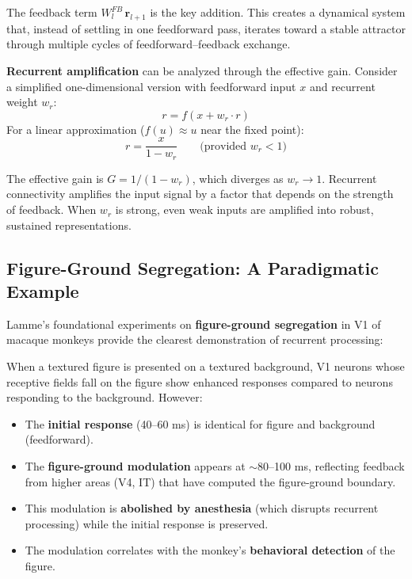 \documentclass[11pt,a4paper]{report}
\begin{document}
The feedback term $W_l^{FB}\, \mathbf{r}_{l+1}$ is the key addition. This creates a dynamical system that, instead of settling in one feedforward pass, iterates toward a stable attractor through multiple cycles of feedforward--feedback exchange.

\textbf{Recurrent amplification} can be analyzed through the effective gain. Consider a simplified one-dimensional version with feedforward input $x$ and recurrent weight $w_r$:
\[
  r = f(x + w_r \cdot r)
\]
For a linear approximation ($f(u) \approx u$ near the fixed point):
\[
  r = \frac{x}{1 - w_r} \qquad \text{(provided } w_r < 1\text{)}
\]

The effective gain is $G = 1/(1 - w_r)$, which diverges as $w_r \to 1$. Recurrent connectivity amplifies the input signal by a factor that depends on the strength of feedback. When $w_r$ is strong, even weak inputs are amplified into robust, sustained representations.

\subsection{Figure-Ground Segregation: A Paradigmatic Example}

Lamme's foundational experiments on \textbf{figure-ground segregation} in V1 of macaque monkeys provide the clearest demonstration of recurrent processing:

\begin{examplebox}
When a textured figure is presented on a textured background, V1 neurons whose receptive fields fall on the figure show enhanced responses compared to neurons responding to the background. However:
\begin{itemize}[leftmargin=1.5em]
  \item The \textbf{initial response} (40--60 ms) is identical for figure and background (feedforward).
  \item The \textbf{figure-ground modulation} appears at $\sim$80--100 ms, reflecting feedback from higher areas (V4, IT) that have computed the figure-ground boundary.
  \item This modulation is \textbf{abolished by anesthesia} (which disrupts recurrent processing) while the initial response is preserved.
  \item The modulation correlates with the monkey's \textbf{behavioral detection} of the figure.
\end{itemize}
\end{examplebox}
\end{document}
